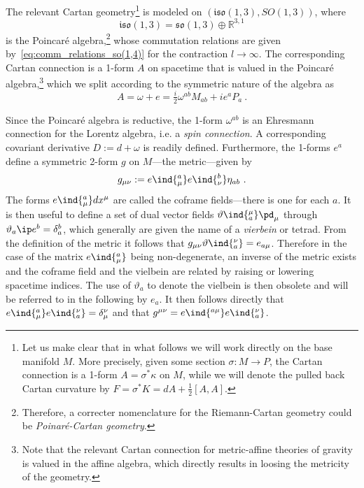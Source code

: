 \documentclass[11pt]{article}
\begin{document}
The relevant Cartan geometry\footnote{Let us make clear that in 
	what follows we will work directly on the base manifold $M$.  
	More precisely, given some section $\sigma : M \to P$, the 
	Cartan connection is a 1-form $A = \sigma^\ast \kappa$ on $M$, 
	while we will denote the pulled back Cartan curvature by $F = 
	\sigma^\ast K = dA + \tfrac{1}{2} [A,A]$.}
is modeled on $(\mathfrak{iso}(1,3),SO(1,3))$, where
\begin{displaymath}
	\mathfrak{iso}(1,3) = \mathfrak{so}(1,3) \oplus 
	\mathbb{R}^{3,1}
\end{displaymath}
is the Poincar\'e algebra,\footnote{Therefore, a correcter 
	nomenclature for the Riemann-Cartan geometry could be 
	\emph{Poinar\'e-Cartan geometry}.} whose commutation relations 
are given by~\eqref{eq:comm_relations_so(1,4)} for the 
contraction $l \to \infty$. The corresponding Cartan connection 
is a 1-form $A$ on spacetime that is valued in the Poincar\'e 
algebra,\footnote{Note that the relevant Cartan connection for 
	metric-affine theories of gravity is valued in the affine 
	algebra, which directly results in loosing the metricity of 
	the geometry.} which we split according to the symmetric 
nature of the algebra as
\begin{displaymath}
	A = \omega + e = \tfrac{i}{2} \omega^{ab} M_{ab} + i e^a P_a~.
\end{displaymath}

Since the Poincar\'e algebra is reductive, the 1-form 
$\omega^{ab}$ is an Ehresmann connection for the Lorentz algebra, 
i.e. a \emph{spin connection}. A corresponding covariant 
derivative $D := d + \omega$ is readily defined.  Furthermore, 
the 1-forms $e^{a}$ define a symmetric 2-form $g$ on $M$---the 
metric---given by
\begin{equation}
	g_{\mu \nu} := e\ind{^a_\mu} e\ind{^b_\nu} \eta_{ab}~.
\end{equation}
The forms $e\ind{^a_\mu} dx^\mu$ are called the coframe 
fields---there is one for each $a$. It is then useful to define a 
set of dual vector fields $\vartheta\ind{_a^\mu} \pd_\mu$ through 
$\vartheta_a \ip e^b = \delta^b_a$, which generally are given the 
name of a \emph{vierbein} or tetrad. From the definition of the 
metric it follows that $g_{\mu\nu} \vartheta\ind{_a^\nu} = 
e_{a\mu}$.  Therefore in the case of the matrix $e\ind{^a_\mu}$ 
being non-degenerate, an inverse of the metric exists and the 
coframe field and the vielbein are related by raising or lowering 
spacetime indices. The use of $\vartheta_a$ to denote the 
vielbein is then obsolete and will be referred to in the 
following by $e_a$. It then follows directly that $e\ind{^a_\mu} 
e\ind{_a^\nu} = \delta^\nu_\mu$ and that $g^{\mu\nu} = 
e\ind{^{a\mu}} e\ind{_a^\nu}$.
\end{document}
